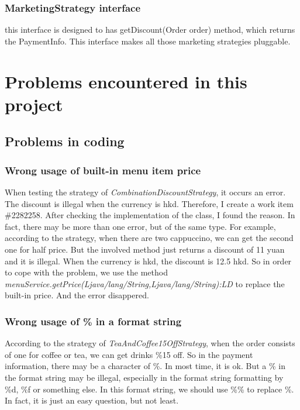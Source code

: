 \documentclass[a4paper]{report}
\begin{document}
\subsection{MarketingStrategy interface}
\par this interface is designed to has getDiscount(Order order) method, which returns the PaymentInfo. This interface makes all those marketing strategies pluggable.

\chapter{Problems encountered in this project}
\section{Problems in coding}
\subsection{Wrong usage of built-in menu item price}
\par When testing the strategy of \emph{CombinationDiscountStrategy}, it occurs an error. The discount is illegal when the currency is hkd. Therefore, I create a work item \#2282258. After checking the implementation of the class, I found the reason. In fact, there may be more than one error, but of the same type. For example, according to the strategy, when there are two cappuccino, we can get the second one for half price. But the involved method just returns a discount of 11 yuan and it is illegal. When the currency is hkd, the discount is 12.5 hkd. So in order to cope with the problem, we use the method \emph{menuService.getPrice(Ljava/lang/String,Ljava/lang/String):LD} to replace the built-in price. And the error disappered.
\subsection{Wrong usage of \% in a format string}
\par According to the strategy of \emph{TeaAndCoffee15OffStrategy}, when the order consists of one for coffee or tea, we can get drinks \%15 off. So in the payment information, there may be a character of \%. In most time, it is ok. But a \% in the format string may be illegal, especially in the format string formatting by \%d, \%f or something else. In this format string, we should use \%\% to replace \%. In fact, it is just an easy question, but not least.
\end{document}
